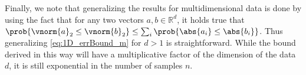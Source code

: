 %
Finally, we note that generalizing the results for multidimensional
data is done by using the fact that for any two vectors
$a,b\in\mathbb{R}^d$, it holds true that
$\prob{\vnorm{a}_2\leq\vnorm{b}_2}\leq\sum_i\prob{\abs{a_i}\leq\abs{b_i}}$. Thus
generalizing
\eqref{eq:1D_errBound_m}
for $d>1$ is
straightforward. While the bound derived in this way will have a
multiplicative factor of the dimension of the data $d$, it is still
exponential in the number of samples $n$.
